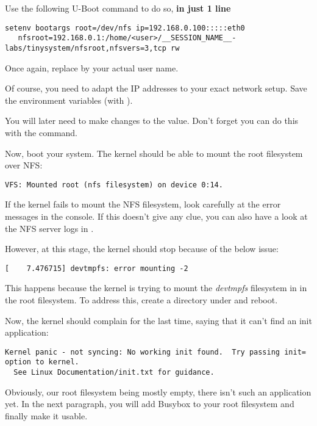 Use the following U-Boot command to do so, {\bf in just 1 line}

\begin{verbatim}
setenv bootargs root=/dev/nfs ip=192.168.0.100:::::eth0
   nfsroot=192.168.0.1:/home/<user>/__SESSION_NAME__-labs/tinysystem/nfsroot,nfsvers=3,tcp rw
\end{verbatim}

Once again, replace  by your actual user name.

Of course, you need to adapt the IP addresses to your exact network
setup. Save the environment variables (with ).

You will later need to make changes to the  value.
Don't forget you can do this with the  command.

Now, boot your system. The kernel should be able to mount the root
filesystem over NFS:

\begin{verbatim}
VFS: Mounted root (nfs filesystem) on device 0:14.
\end{verbatim}

If the kernel fails to mount the NFS filesystem, look carefully at the
error messages in the console. If this doesn't give any clue, you can
also have a look at the NFS server logs in .

However, at this stage, the kernel should stop because of the below
issue:

\begin{verbatim}
[    7.476715] devtmpfs: error mounting -2
\end{verbatim}

This happens because the kernel is trying to mount the {\em devtmpfs}
filesystem in  in the root filesystem. To address this,
create a  directory under  and reboot.

Now, the kernel should complain for the last time, saying that it can't
find an init application:

\footnotesize
\begin{verbatim}
Kernel panic - not syncing: No working init found.  Try passing init= option to kernel.
  See Linux Documentation/init.txt for guidance.
\end{verbatim}
\normalsize

Obviously, our root filesystem being mostly empty, there isn't such an
application yet. In the next paragraph, you will add Busybox to your root
filesystem and finally make it usable.


